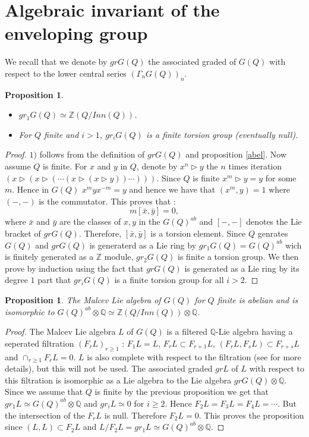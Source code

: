 \documentclass[12pt, reqno]{amsart}
\newtheorem{proposition}[theorem]{Proposition}
\newcommand{\Z}{ {\mathbb Z} }
\begin{document}
\section{Algebraic invariant of the enveloping group} 
We recall that we denote by $gr G(Q)$ the associated graded of $G(Q)$ with respect to the lower central series $(\Gamma_n G(Q))_n$.
\begin{proposition}\label{gr}
\begin{itemize}
\item[1)] $gr_1 G(Q) \simeq  \Z (Q/Inn(Q))$.
\item[2)] For $Q$ finite and $i>1$, $gr_i G(Q)$ is a finite torsion group (eventually null). 
\end{itemize}
\end{proposition}
\begin{proof}
$1)$ follows from the definition of $gr G(Q)$ and proposition \ref{abel}. Now assume $Q$ is finite. For $x$ and $y$ in $Q$, denote by $x^n\triangleright y$ the $n$ times iteration $(x\triangleright(x\triangleright (\cdots (x\triangleright(x \triangleright y))\cdots)))$. Since $Q$ is finite $x^m\triangleright y=y$ for some $m$. Hence in $G(Q)$ $x^m y x^{-m}=y$ and hence we have that $(x^m,y)=1$ where$(-,-)$ is the commutator. This proves that : 
$$m[\bar{x},\bar{y}]=0,$$
where $\bar{x}$ and $\bar{y}$ are the classes of $x,y$ in the $G(Q)^{ab}$ and $[-,-]$ denotes the Lie bracket of $grG(Q)$. Therefore, $[\bar{x},\bar{y}]$ is a torsion element.  Since $Q$ genrates $G(Q)$ and $grG(Q)$ is generaterd as a Lie ring by $gr_1G(Q)=G(Q)^{ab}$ wich is finitely generated as a $\Z$ module, $gr_2 G(Q)$ is finite a torsion group. We then prove by induction using the fact that $gr G(Q)$ is generated as a Lie ring by its degree $1$ part that $gr_i G(Q)$ is a finite torsion group for all $i>2$.
\end{proof}
\begin{proposition}
The Malcev Lie algebra of $G(Q)$ for $Q$ finite is abelian and is isomorphic to $G(Q)^{ab}\otimes \mathbb{Q}\simeq \Z (Q/Inn(Q))\otimes \mathbb{Q}$.
\end{proposition}
\begin{proof}
The Malcev Lie algebra $L$ of $G(Q)$ is a filtered $\mathbb{Q}$-Lie algebra having a seperated filtration $(F_rL)_{r\geq 1}$ : $F_1L=L$, $F_rL \subset F_{r+1}L$, $(F_rL,F_sL) \subset F_{r+s}L$ and $\cap_{r\geq 1} F_r L=0$. $L$ is also complete with respect to the filtration (see \cite{RHT} for more details), but this will not be used. The associated graded $gr L$ of $L$ with respect to this filtration is isomorphic as a Lie algebra to the Lie algebra $grG(Q)\otimes \mathbb{Q}$. Since we assume that $Q$ is finite by the previous proposition we get that $gr_1 L\simeq  G(Q)^{ab}\otimes \mathbb{Q}$ and $gr_iL \simeq 0$ for $i\geq 2$. Hence $F_2L=F_3L=F_4L=\cdots$. But the intersection of the $F_rL$ is null. Therefore $F_2L=0$. This proves the proposition since $(L,L) \subset F_2L$ and $L/F_2L= gr_1L \simeq G(Q)^{ab}\otimes \mathbb{Q}$.
\end{proof}
\end{document}
